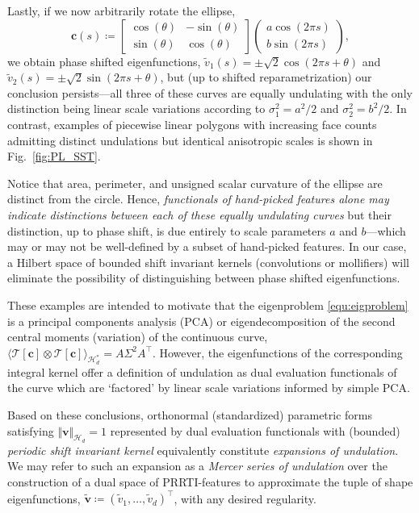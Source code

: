 \documentclass[pdflatex,iicol]{sn-jnl}%
\theoremstyle{thmstyleone}%
\theoremstyle{thmstyletwo}%
\theoremstyle{thmstylethree}%
\begin{document}
Lastly, if we now arbitrarily rotate the ellipse,
\begin{equation}
    \boldsymbol{c}(s) \coloneqq \left[ \begin{matrix}
    \cos(\theta) & -\sin(\theta)\\
    \sin(\theta) & \cos(\theta)
    \end{matrix}\right]\left(\begin{matrix}
        a\cos (2\pi s)\\
        b\sin (2\pi s)
    \end{matrix}\right),
\end{equation}
we obtain phase shifted eigenfunctions, $\widetilde{v}_1(s) = \pm\sqrt{2}\cos(2\pi s + \theta)$ and $\widetilde{v}_2(s) = \pm \sqrt{2}\sin(2\pi s + \theta)$, but (up to shifted reparametrization) our conclusion persists---all three of these curves are equally undulating with the only distinction being linear scale variations according to $\sigma_1^2 = a^2/2$ and $\sigma_2^2 = b^2/2$. In contrast, examples of piecewise linear polygons with increasing face counts admitting distinct undulations but identical anisotropic scales is shown in Fig.~\ref{fig:PL_SST}.

Notice that area, perimeter, and unsigned scalar curvature of the ellipse are distinct from the circle. Hence, \emph{functionals of hand-picked features alone may indicate distinctions between each of these equally undulating curves} but their distinction, up to phase shift, is due entirely to scale parameters $a$ and $b$---which may or may not be well-defined by a subset of hand-picked features. In our case, a Hilbert space of bounded shift invariant kernels (convolutions or mollifiers) will eliminate the possibility of distinguishing between phase shifted eigenfunctions.

These examples are intended to motivate that the eigenproblem \eqref{equ:eigproblem} is a principal components analysis (PCA) or eigendecomposition of the second central moments (variation) of the continuous curve,
$
\langle \mathcal{T}[\boldsymbol{c}] \otimes \mathcal{T}[\boldsymbol{c}]\rangle_{\mathcal{H}^*_d} = A\Sigma^2 A^{\top}.
$
However, the eigenfunctions of the corresponding integral kernel offer a definition of undulation as dual evaluation functionals of the curve which are `factored' by linear scale variations informed by simple PCA. 

Based on these conclusions, orthonormal (standardized) parametric forms satisfying $\Vert \boldsymbol{v} \Vert_{\mathcal{H}_d} = 1$ represented by dual evaluation functionals with (bounded) \emph{periodic shift invariant kernel} equivalently constitute \emph{expansions of undulation}. We may refer to such an expansion as a \emph{Mercer series of undulation} over the construction of a dual space of PRRTI-features to approximate the tuple of shape eigenfunctions, $\widetilde{\boldsymbol{v}} \coloneqq (\widetilde{v}_1,\dots,\widetilde{v}_d)^{\top}$, with any desired regularity.
\end{document}
